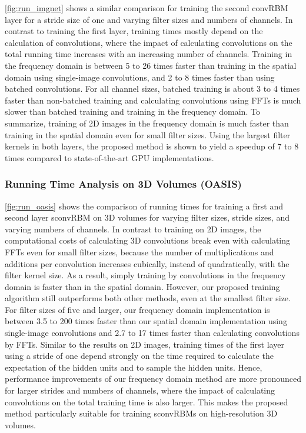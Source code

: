 \ref{fig:run_imgnet} shows a similar comparison for
training the second convRBM layer for a stride size of one and varying filter
sizes and numbers of channels. In contrast to training the first layer, training
times mostly depend on the calculation of convolutions, where the impact of
calculating convolutions on the total running time increases with an increasing
number of channels. Training in the frequency domain is between 5 to 26 times
faster than training in the spatial domain using single-image convolutions, and
2 to 8 times faster than using batched convolutions. For all channel sizes,
batched training is about 3 to 4 times faster than non-batched training and
calculating convolutions using FFTs is much slower than batched training and
training in the frequency domain. To summarize, training of 2D images in the
frequency domain is much faster than training in the spatial domain even for
small filter sizes. Using the largest filter kernels in both layers, the
proposed method is shown to yield a speedup of 7 to 8 times compared to
state-of-the-art GPU implementations.

\subsubsection{Running Time Analysis on 3D Volumes (OASIS)}

\ref{fig:run_oasis} shows the comparison of running times for training a first
and second layer sconvRBM on 3D volumes for varying filter sizes, stride sizes,
and varying numbers of channels. In contrast to training on 2D images, the
computational costs of calculating 3D convolutions break even with calculating
FFTs even for small filter sizes, because the number of multiplications and
additions per convolution increases cubically, instead of quadratically, with
the filter kernel size. As a result, simply training by convolutions in the
frequency domain is faster than in the spatial domain. However, our proposed
training algorithm still outperforms both other methods, even at the smallest
filter size. For filter sizes of five and larger, our frequency domain
implementation is between 3.5 to 200 times faster than our spatial domain
implementation using single-image convolutions and 2.7 to 17 times faster than
calculating convolutions by FFTs. Similar to the results on 2D images, training
times of the first layer using a stride of one depend strongly on the time
required to calculate the expectation of the hidden units and to sample the
hidden units. Hence, performance improvements of our frequency domain method are
more pronounced for larger strides and numbers of channels, where the impact of
calculating convolutions on the total training time is also larger. This makes
the proposed method particularly suitable for training sconvRBMs on
high-resolution 3D volumes.

